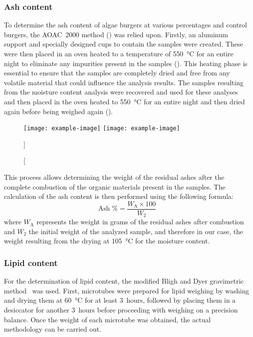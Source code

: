 \subsubsection{Ash content}
To determine the ash content of algae burgers at various percentages and control burgers, the AOAC~2000 method () was relied upon. Firstly, an aluminum support and specially designed cups to contain the samples were created. These were then placed in an oven heated to a temperature of \qty{550}{\degreeCelsius} for an entire night to eliminate any impurities present in the samples (). This heating phase is essential to ensure that the samples are completely dried and free from any volatile material that could influence the analysis results. The samples resulting from the moisture content analysis were recovered and used for these analyses and then placed in the oven heated to \qty{550}{\degreeCelsius} for an entire night and then dried again before being weighed again ().

\begin{figure}[H]
\centering
		{\texttt{[image: example-image]}}%
\hfill
		{\texttt{[image: example-image]}}%
\caption%
[]%
{}
\label{fig:}
\end{figure}

This process allows determining the weight of the residual ashes after the complete combustion of the organic materials present in the samples. The calculation of the ash content is then performed using the following formula:
\[
\text{Ash \%} = \frac{W_\text{A} \times 100}{W_2}
\]
where $ W_\text{A} $ represents the weight in grams of the residual ashes after combustion and $ W_2 $ the initial weight of the analyzed sample, and therefore in our case, the weight resulting from the drying at \qty{105}{\degreeCelsius} for the moisture content.


\subsubsection{Lipid content}
For the determination of lipid content, the modified Bligh and Dyer gravimetric method~\parencite{bligh_RAPID_1959} was used. First, microtubes were prepared for lipid weighing by washing and drying them at \qty{60}{\degreeCelsius} for at least \qty{3}{hours}, followed by placing them in a desiccator for another \qty{3}{hours} before proceeding with weighing on a precision balance. Once the weight of each microtube was obtained, the actual methodology can be carried out.

